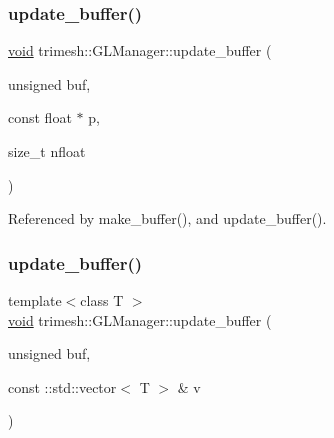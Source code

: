 \subsubsection{\texorpdfstring{update\+\_\+buffer()}{update\_buffer()}\hspace{0.1cm}{\footnotesize\ttfamily [1/2]}}
{\footnotesize\ttfamily \hyperlink{namespacetrimesh_a784ddfd979e1c579bda795a8edfc3f43}{void} trimesh\+::\+G\+L\+Manager\+::update\+\_\+buffer (\begin{DoxyParamCaption}\item[{unsigned}]{buf,  }\item[{const float $\ast$}]{p,  }\item[{size\+\_\+t}]{nfloat }\end{DoxyParamCaption})}



Referenced by make\+\_\+buffer(), and update\+\_\+buffer().

\mbox{\label{classtrimesh_1_1GLManager_a9773cc6bf61c3307e043a63c3507bdd4}} 
\subsubsection{\texorpdfstring{update\+\_\+buffer()}{update\_buffer()}\hspace{0.1cm}{\footnotesize\ttfamily [2/2]}}
{\footnotesize\ttfamily template$<$class T $>$ \\
\hyperlink{namespacetrimesh_a784ddfd979e1c579bda795a8edfc3f43}{void} trimesh\+::\+G\+L\+Manager\+::update\+\_\+buffer (\begin{DoxyParamCaption}\item[{unsigned}]{buf,  }\item[{const \+::std\+::vector$<$ T $>$ \&}]{v }\end{DoxyParamCaption})\hspace{0.3cm}{\ttfamily [inline]}}

\mbox{\label{classtrimesh_1_1GLManager_a89dde9710b34ab4e04f285cfac605dfa}} 
